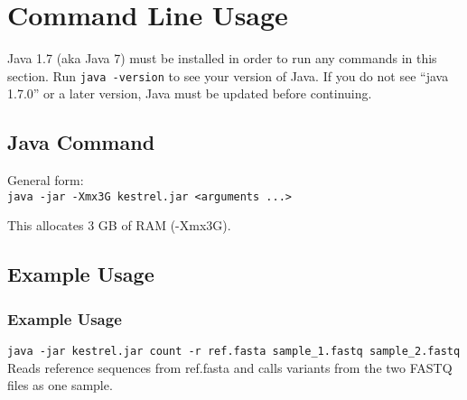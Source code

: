 
\newcommand{\optwidth}{0.15\textwidth}
\newcommand{\argwidth}{0.20\textwidth}
\newcommand{\dscwidth}{0.50\textwidth}
\newcommand{\defwidth}{0.15\textwidth}

\newcommand{\optbox}[1]{\parbox[t][][t]{\optwidth}{#1}\vspace{0.25em}}
\newcommand{\argbox}[1]{\parbox{\argwidth}{#1}}
\newcommand{\dscbox}[1]{\parbox{\dscwidth}{#1}}
\newcommand{\defbox}[1]{\parbox{\defwidth}{#1}}




\section{Command Line Usage}
\label{sec.cmdline}

Java 1.7 (aka Java 7) must be installed in order to run any commands in this section. Run \texttt{java -version} to see your version of Java. If you do not see ``java 1.7.0'' or a later version, Java must be updated before continuing.


\subsection{Java Command}
\label{sec.cmdline.javacommand}

General form:\\
\texttt{java -jar -Xmx3G kestrel.jar <arguments ...>}

This allocates 3 GB of RAM (-Xmx3G).

\subsection{Example Usage}
\label{sec.cmdline.example}


\subsubsection{Example Usage}
\label{sec.cmdline.count.egusage}

\texttt{java -jar kestrel.jar count -r ref.fasta sample\_1.fastq sample\_2.fastq}\\
\hspace*{1cm}Reads reference sequences from ref.fasta and calls variants from the two FASTQ files as one sample.

